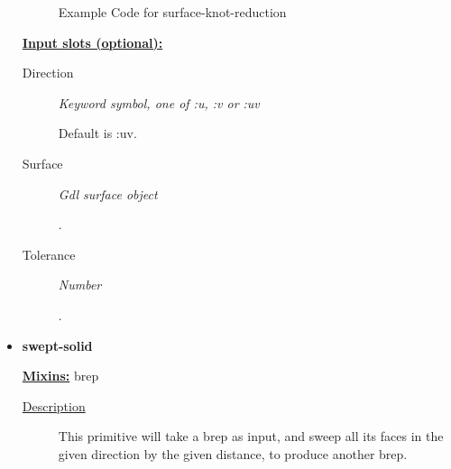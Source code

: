 \documentclass [11pt]{book}
\begin{document}
\begin{itemize}
\begin{figure}
\caption{Example Code for surface-knot-reduction}

\label{fig:example-code-surface-knot-reduction}

\end{figure}





\textbf{
\underline{Input slots (optional):}}

\begin{description}

\item [Direction]
\emph{Keyword symbol, one of :u, :v or :uv}

 Default is :uv.




\item [Surface]
\emph{Gdl surface object}

.




\item [Tolerance]
\emph{Number}

.




\end{description}







\item {}
\label{prim:swept-solid}
\textbf{swept-solid}


\textbf{
\underline{Mixins:}} brep





\begin{description}

\item [
\underline{Description}]


This primitive will take a brep as input,
and sweep all its faces in the given direction by the given distance,
to produce another brep.



\end{description}




\begin{figure}
\begin{lrbox}{\boxedverb}
\begin{minipage}{\linewidth}
{\small

}
\end{minipage}
\end{lrbox}
\end{figure}
\end{itemize}
\end{document}
